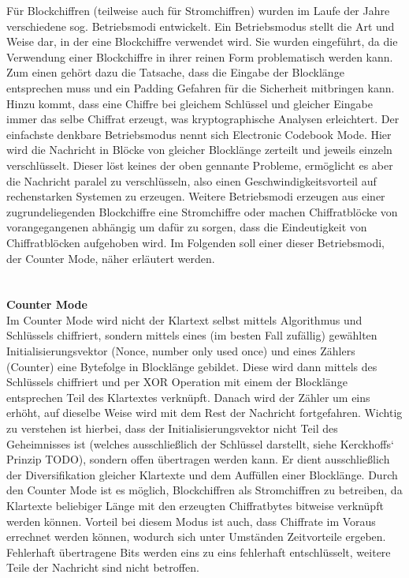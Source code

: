 \documentclass[13pt,a4paper,bibliography=totocnumbered,listof=totocnumbered]{scrartcl}
\begin{document}
Für Blockchiffren (teilweise auch für Stromchiffren) wurden im Laufe der Jahre verschiedene sog. Betriebsmodi entwickelt. Ein Betriebsmodus stellt die Art und Weise dar, in der eine Blockchiffre verwendet wird. Sie wurden eingeführt, da die Verwendung einer Blockchiffre in ihrer reinen Form problematisch werden kann. Zum einen gehört dazu die Tatsache, dass die Eingabe der Blocklänge entsprechen muss und ein Padding Gefahren für die Sicherheit mitbringen kann. Hinzu kommt, dass eine Chiffre bei gleichem Schlüssel und gleicher Eingabe immer das selbe Chiffrat erzeugt, was kryptographische Analysen erleichtert. Der einfachste denkbare Betriebsmodus nennt sich Electronic Codebook Mode. Hier wird die Nachricht in Blöcke von gleicher Blocklänge zerteilt und jeweils einzeln verschlüsselt. Dieser löst keines der oben gennante Probleme, ermöglicht es aber die Nachricht paralel zu verschlüsseln, also einen Geschwindigkeitsvorteil auf rechenstarken Systemen zu erzeugen. Weitere Betriebsmodi erzeugen aus einer zugrundeliegenden Blockchiffre eine Stromchiffre oder machen Chiffratblöcke von vorangegangenen abhängig um dafür zu sorgen, dass die Eindeutigkeit von Chiffratblöcken aufgehoben wird. Im Folgenden soll einer dieser Betriebsmodi, der Counter Mode, näher erläutert werden.\\
 \cite[S. 223ff.]{42}\\
\\\textbf{Counter Mode}\\
Im Counter Mode wird nicht der Klartext selbst mittels Algorithmus und Schlüssels chiffriert, sondern mittels eines (im besten Fall zufällig) gewählten Initialisierungsvektor (Nonce, number only used once) und eines Zählers (Counter) eine Bytefolge in Blocklänge gebildet. Diese wird dann mittels des Schlüssels chiffriert und per XOR Operation mit einem der Blocklänge entsprechen Teil des Klartextes verknüpft. Danach wird der Zähler um eins erhöht, auf dieselbe Weise wird mit dem Rest der Nachricht fortgefahren. Wichtig zu verstehen ist hierbei, dass der Initialisierungsvektor nicht Teil des Geheimnisses ist (welches ausschließlich der Schlüssel darstellt, siehe Kerckhoffs‘ Prinzip TODO), sondern offen übertragen werden kann. Er dient ausschließlich der Diversifikation gleicher Klartexte und dem Auffüllen einer Blocklänge. Durch den Counter Mode ist es möglich, Blockchiffren als Stromchiffren zu betreiben, da Klartexte beliebiger Länge mit den erzeugten Chiffratbytes bitweise verknüpft werden können. Vorteil bei diesem Modus ist auch, dass Chiffrate im Voraus errechnet werden können, wodurch sich unter Umständen Zeitvorteile ergeben. Fehlerhaft übertragene Bits werden eins zu eins fehlerhaft entschlüsselt, weitere Teile der Nachricht sind nicht betroffen.\\
\end{document}

